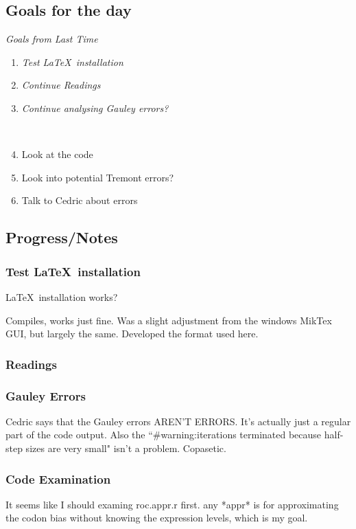 \subsection{Goals for the day}

\textit{Goals from Last Time}
\begin{enumerate}
\item \textit{Test \LaTeX~installation}
\item \textit{Continue Readings}
\item \textit{Continue analysing Gauley errors?}

~


\item Look at the code
\item Look into potential Tremont errors?
\item Talk to Cedric about errors
\end{enumerate}

\subsection{Progress/Notes}
\subsubsection{Test \LaTeX~installation}
\LaTeX~installation works?

Compiles, works just fine. Was a slight adjustment from the windows MikTex GUI, but largely the same.
Developed the format used here.

\subsubsection{Readings}

\subsubsection{Gauley Errors}

Cedric says that the Gauley errors AREN'T ERRORS. It's actually just a regular part of the code output. Also the ``\#warning:iterations terminated because half-step sizes are very small" isn't a problem. Copasetic.

\subsubsection{Code Examination}
It seems like I should examing roc.appr.r first. any *appr* is for approximating the codon bias without knowing the expression levels, which is my goal.

